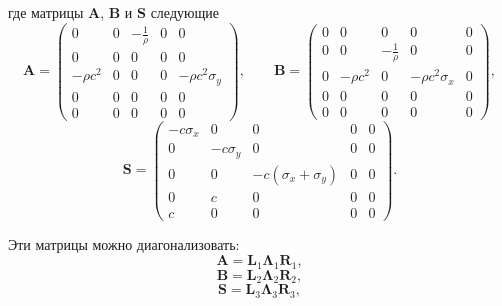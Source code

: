 \noindent где матрицы $\pmb{A}$, $\pmb{B}$ и $\pmb{S}$ следующие
\begin{equation*}
    \pmb{A} = \begin{pmatrix}
        0 & 0 & -\frac{1}{\rho} & 0 & 0 \\
        0 & 0 & 0 & 0 & 0 \\
        -\rho c^2 & 0 & 0 & 0 & -\rho c^2 \sigma_y \\
        0 & 0 & 0 & 0 & 0 \\
        0 & 0 & 0 & 0 & 0
    \end{pmatrix} 
    , \qquad
	\pmb{B} = \begin{pmatrix}
        0 & 0 & 0 & 0 & 0 \\
        0 & 0 & -\frac{1}{\rho} & 0 & 0 \\
        0 & -\rho c^2  & 0 & -\rho c^2 \sigma_x & 0 \\
        0 & 0 & 0 & 0 & 0 \\
        0 & 0 & 0 & 0 & 0
    \end{pmatrix},
\end{equation*}
\begin{equation*}
	\pmb{S} = \begin{pmatrix}
        -c \sigma_x & 0 & 0 & 0 & 0 \\
        0 & -c \sigma_y & 0 & 0 & 0 \\
        0 & 0 & -c (\sigma_x + \sigma_y) & 0 & 0 \\
        0 & c & 0 & 0 & 0 \\
        c & 0 & 0 & 0 & 0
    \end{pmatrix}
    .
\end{equation*}

\noindent Эти матрицы можно диагонализовать:
\begin{equation*}
    \pmb{A} = \pmb{L}_1 \pmb{\Lambda}_1 \pmb{R}_1 ,
\end{equation*}
\begin{equation*}
    \pmb{B} = \pmb{L}_2 \pmb{\Lambda}_2 \pmb{R}_2 ,
\end{equation*}
\begin{equation*}
    \pmb{S} =\pmb{L}_3 \pmb{\Lambda}_3 \pmb{R}_3 ,
\end{equation*}

